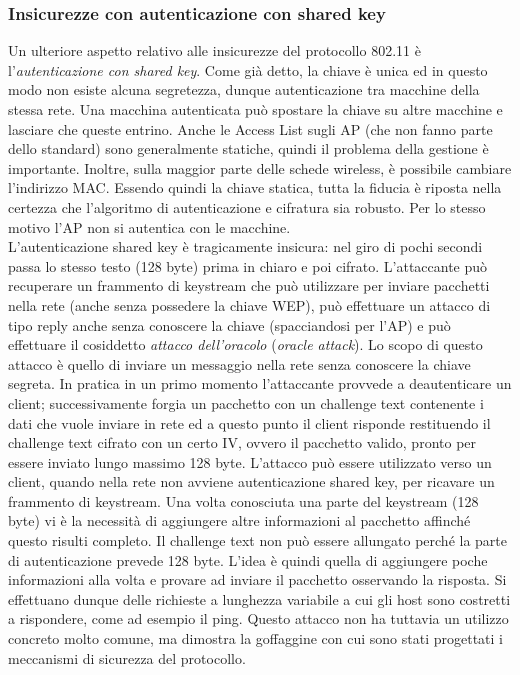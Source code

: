 \subsubsection{Insicurezze con autenticazione con shared key}
Un ulteriore aspetto relativo alle insicurezze del protocollo 802.11 è l'\textit{autenticazione con shared key}. Come già detto, la chiave è unica ed in questo modo non esiste alcuna segretezza, dunque autenticazione tra macchine della stessa rete. Una macchina autenticata può spostare la chiave su altre macchine e lasciare che queste entrino. Anche le Access List sugli AP (che non fanno parte dello standard) sono generalmente statiche, quindi il problema della gestione è importante. Inoltre, sulla maggior parte delle schede wireless, è possibile cambiare l'indirizzo MAC. Essendo quindi la chiave statica, tutta la fiducia è riposta nella certezza che l'algoritmo di autenticazione e cifratura sia robusto. Per lo stesso motivo l'AP non si autentica con le macchine.\\

L'autenticazione shared key è tragicamente insicura: nel giro di pochi secondi passa lo stesso testo (128 byte) prima in chiaro e poi cifrato. L'attaccante può recuperare un frammento di keystream che può utilizzare per inviare pacchetti nella rete (anche senza possedere la chiave WEP), può effettuare un attacco di tipo reply anche senza conoscere la chiave (spacciandosi per l'AP) e può effettuare il cosiddetto \textit{attacco dell'oracolo} (\textit{oracle attack}). Lo scopo di questo attacco è quello di inviare un messaggio nella rete senza conoscere la chiave segreta. In pratica in un primo momento l'attaccante provvede a deautenticare un client; successivamente forgia un pacchetto con un challenge text contenente i dati che vuole inviare in rete ed a questo punto il client risponde restituendo il challenge text cifrato con un certo IV, ovvero il pacchetto valido, pronto per essere inviato lungo massimo 128 byte. L'attacco può essere utilizzato verso un client, quando nella rete non avviene autenticazione shared key, per ricavare un frammento di keystream. Una volta conosciuta una parte del keystream (128 byte) vi è la necessità di aggiungere altre informazioni al pacchetto affinché questo risulti completo. Il challenge text non può essere allungato perché la parte di autenticazione prevede 128 byte. L'idea è quindi quella di aggiungere poche informazioni alla volta e provare ad inviare il pacchetto osservando la risposta. Si effettuano dunque delle richieste a lunghezza variabile a cui gli host sono costretti a rispondere, come ad esempio il ping. Questo attacco non ha tuttavia un utilizzo concreto molto comune, ma dimostra la goffaggine con cui sono stati progettati i meccanismi di sicurezza del protocollo.\\

